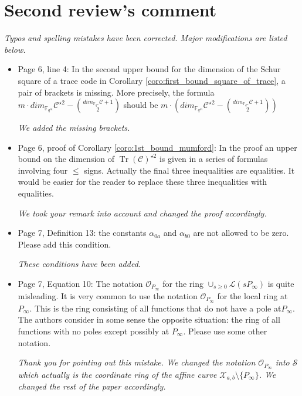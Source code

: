 \documentclass[12pt,a4paper]{amsart}
\DeclareMathOperator{\trace}{Tr}
\newcommand{\fqm}{\mathbb{F}_{q^m}}
\newcommand{\calC}{\mathcal{C}}
\newcommand{\calX}{\mathcal{X}}
\newcommand{\Tr}[1]{\trace\!\left(#1\right)}
\begin{document}
\section*{Second review's comment}

\textit{Typos and spelling mistakes have been corrected. Major modifications are listed below.} \\

\begin{itemize}

\item Page 6, line 4: In the second upper bound for the dimension of the Schur square of a trace code in Corollary \ref{coro:first_bound_square_of_trace}, a pair of brackets is missing. More precisely, the formula $m \cdot dim_{\fqm} \calC^{\star 2}-\binom{dim_{\fqm}\calC+1}{2}$ should be $m \cdot \left( dim_{\fqm} \calC^{\star 2} -\binom{dim_{\fqm} \calC+1}{2}\right)$

\textit{We added the missing brackets.}

\item Page 6, proof of Corollary \ref{coro:1st_bound_mumford}: In the proof an upper bound on the dimension of $\Tr{\calC}^{\star 2}$ is given in a series of formulas involving four $\le$ signs. Actually the final three inequalities are equalities. It would be easier for the reader to replace these three inequalities with equalities.

\textit{We took your remark into account and changed the proof accordingly.}


\item Page 7, Definition 13: the constants $\alpha_{0a}$ and $\alpha_{b0}$ are not allowed to be zero. Please add this condition.

\textit{These conditions have been added.} 

\item Page 7, Equation 10: The notation $\mathcal{O}_{P_\infty}$ for the ring $\cup_{s \ge 0} \mathcal{L}(sP_\infty)$ is quite misleading. It is very common to use the notation $\mathcal{O}_{P_\infty}$ for the local ring at $P_\infty$. This is the ring consisting of all functions that do not have a pole at$ P_\infty$. The authors consider in some sense the opposite situation: the ring of all functions with no poles except possibly at $P_\infty$. Please use some other notation.

\textit{Thank you for pointing out this mistake. We changed the notation $\mathcal{O}_{P_\infty}$ into $\mathcal{S}$ which actually is the coordinate ring of the affine curve $\calX_{a,b} \setminus \{P_\infty\}$. We changed the rest of the paper accordingly.}


\end{itemize}
\end{document}
